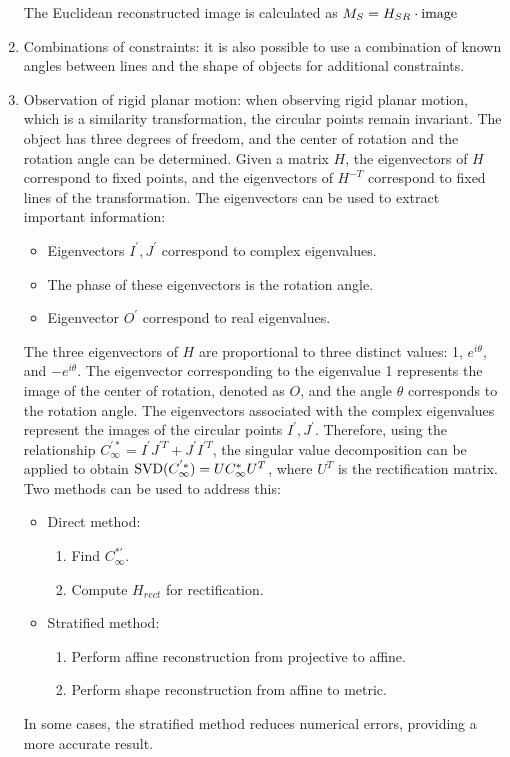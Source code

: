 \documentclass[12pt, a4paper]{report}
\begin{document}
\begin{enumerate}
            The Euclidean reconstructed image is calculated as $M_S=H_{SR} \cdot \textnormal{image}$
        \item Combinations of constraints: it is also possible to use a combination of known angles between lines and the shape of objects for additional constraints.
        \item Observation of rigid planar motion: when observing rigid planar motion, which is a similarity transformation, the circular points remain invariant.
            The object has three degrees of freedom, and the center of rotation and the rotation angle can be determined.
            Given a matrix $H$, the eigenvectors of $H$ correspond to fixed points, and the eigenvectors of $H^{-T}$ correspond to fixed lines of the transformation.
            The eigenvectors can be used to extract important information:
            \begin{itemize}
                \item Eigenvectors $I^{'},J^{'}$ correspond to complex eigenvalues. 
                \item The phase of these eigenvectors is the rotation angle.
                \item Eigenvector $O^{'}$ correspond to real eigenvalues. 
            \end{itemize}
            The three eigenvectors of $H$ are proportional to three distinct values: 1, $e^{i\theta}$, and $-e^{i\theta}$.
            The eigenvector corresponding to the eigenvalue 1 represents the image of the center of rotation, denoted as $O$, and the angle $\theta$ corresponds to the rotation angle. 
            The eigenvectors associated with the complex eigenvalues represent the images of the circular points $I^{'},J^{'}$. 
            Therefore, using the relationship $C_{\infty}^{'*}=I^{'}J^{'T}+J^{'}I^{'T}$, the singular value decomposition can be applied to obtain $\textnormal{SVD}(C_{\infty}^{'*})=UC_{\infty}^{*}U^T$, where $U^T$ is the rectification matrix. 
            Two methods can be used to address this:
            \begin{itemize}
                \item Direct method: 
                    \begin{enumerate}
                        \item Find $C_{\infty}^{*'}$. 
                        \item Compute $H_{rect}$ for rectification. 
                    \end{enumerate}
                \item Stratified method: 
                    \begin{enumerate}
                        \item Perform affine reconstruction from projective to affine.
                        \item Perform shape reconstruction from affine to metric.
                    \end{enumerate}
            \end{itemize}
            In some cases, the stratified method reduces numerical errors, providing a more accurate result.
    \end{enumerate}
\end{document}
